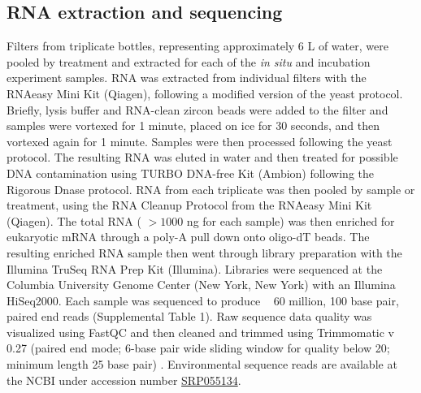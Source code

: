 \subsection{RNA extraction and sequencing}
Filters from triplicate bottles, representing approximately 6 L of water, were pooled by treatment and extracted for each of the \textit{in situ} and incubation experiment samples. RNA was extracted from individual filters with the RNAeasy Mini Kit (Qiagen), following a modified version of the yeast protocol. Briefly, lysis buffer and RNA-clean zircon beads were added to the filter and samples were vortexed for 1 minute, placed on ice for 30 seconds, and then vortexed again for 1 minute. Samples were then processed following the yeast protocol. The resulting RNA was eluted in water and then treated for possible DNA contamination using TURBO DNA-free Kit (Ambion) following the Rigorous Dnase protocol. RNA from each triplicate was then pooled by sample or treatment, using the RNA Cleanup Protocol from the RNAeasy Mini Kit (Qiagen). The total RNA ( $>1000$ ng for each sample) was then enriched for eukaryotic mRNA through a poly-A pull down onto oligo-dT beads. The resulting enriched RNA sample then went through library preparation with the Illumina TruSeq RNA Prep Kit (Illumina). Libraries were sequenced at the Columbia University Genome Center (New York, New York) with an Illumina HiSeq2000. Each sample was sequenced to produce ~ 60 million, 100 base pair, paired end reads (Supplemental Table 1). Raw sequence data quality was visualized using FastQC \citep{Andrews} and then cleaned and trimmed using Trimmomatic v 0.27 (paired end mode; 6-base pair wide sliding window for quality below 20; minimum length 25 base pair) \citep{Lohse2012}. Environmental sequence reads are available at the NCBI under accession number \href{http://www.ncbi.nlm.nih.gov/sra/?term=SRP055134}{SRP055134}. 
